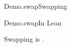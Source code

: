 \documentclass{article}
\begin{document}
\begin{leanblock}[view=math]{Demo.swap}{Swapping}
\end{leanblock}
\begin{leanblock}{Demo.swap}{In Lean}
\end{leanblock}
Swapping is .

\end{document}
